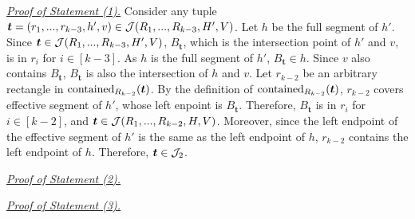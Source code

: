\noindent \underline{\em Proof of Statement (1).} Consider any tuple $\textrm{\boldmath${t}$} = (r_1,...,r_{k-3}, h', v) \in \mathcal{J}(R_1,...,R_{k-3},H',V)$. Let $h$ be the full segment of $h'$. Since $\textrm{\boldmath${t}$} \in \mathcal{J}(R_1,...,R_{k-3},H',V)$, $B_\bm{t}$, which is the intersection point of $h'$ and $v$, is in $r_i$ for $i \in [k-3]$. As $h$ is the full segment of $h'$, $B_\bm{t} \in h$. Since $v$ also contains $B_\bm{t}$, $B_\bm{t}$ is also the intersection of $h$ and $v$. Let $r_{k-2}$ be an arbitrary rectangle in $\mathrm{contained}_{R_{k-2}}(\textrm{\boldmath${t}$})$. By the definition of $\mathrm{contained}_{R_{k-2}}(\textrm{\boldmath${t}$})$, $r_{k-2}$ covers effective segment of $h'$, whose left enpoint is $B_{\bm{t}}$. Therefore, $B_{\bm{t}}$ is in $r_{i}$ for $i \in [k-2]$, and $\textrm{\boldmath${t}$} \in \mathcal{J}(R_1,...,R_{k-2},H,V)$. Moreover, since the left endpoint of the effective segment of $h'$ is the same as the left endpoint of $h$, $r_{k-2}$ contains the left endpoint of $h$. Therefore, $\textrm{\boldmath${t}$} \in \mathcal{J}_2$.

\vgap 

\noindent \underline{\em Proof of Statement (2).} 

\vgap 

\noindent \underline{\em Proof of Statement (3).}


\vgap 